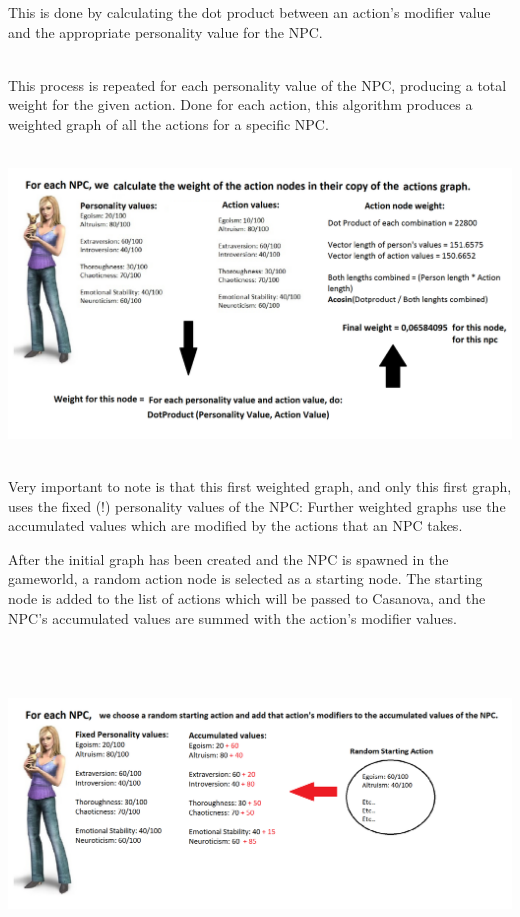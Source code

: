 \documentclass[11pt]{article} %
\begin{document}
\newpage
This is done by calculating the dot product between an action's modifier value and the appropriate personality value for the NPC. 

~\\
This process is repeated for each personality value of the NPC, producing a total weight for the given action. Done for each action, this algorithm produces a weighted graph of all the actions for a specific NPC.


~\\
\includegraphics[scale=0.4]{FillingAlgorithm}


~\\
Very important to note is that this first weighted graph, and only this first graph, uses the fixed (!) personality values of the NPC: Further weighted graphs use the accumulated values which are modified by the actions that an NPC takes.


\newpage
After the initial graph has been created and the NPC is spawned in the gameworld, a random action node is selected as a starting node. The starting node is added to the list of actions which will be passed to Casanova, and the NPC's accumulated values are summed with the action's modifier values. 

~\\
\includegraphics[width=17cm, height=7.5cm]{DecisionMakingAlgorithm}
\end{document}
